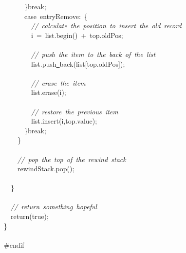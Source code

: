 {\ \ \ \ \ \ \}break;\\
\ \ \ \ \ \ case\ entryRemove:\ \{\\
\ \ \ \ \ \ \ \ \textsl{//\ calculate\ the\ position\ to\ insert\ the\ old\ record}\\
\ \ \ \ \ \ \ \ i\ =\ list.begin()\ +\ top.oldPos;\\
\ \\
\ \ \ \ \ \ \ \ \textsl{//\ push\ the\ item\ to\ the\ back\ of\ the\ list}\\
\ \ \ \ \ \ \ \ list.push\underline\ back(list[top.oldPos]);\\
\ \\
\ \ \ \ \ \ \ \ \textsl{//\ erase\ the\ item}\\
\ \ \ \ \ \ \ \ list.erase(i);\\
\ \\
\ \ \ \ \ \ \ \ \textsl{//\ restore\ the\ previous\ item}\\
\ \ \ \ \ \ \ \ list.insert(i,top.value);\\
\ \ \ \ \ \ \}break;\\
\ \ \ \ \}\\
\ \\
\ \ \ \ \textsl{//\ pop\ the\ top\ of\ the\ rewind\ stack}\\
\ \ \ \ rewindStack.pop();\\
\ \\
\ \ \}\\
\ \\
\ \ \textsl{//\ return\ something\ hopeful}\\
\ \ return(true);\\
\}\\
\ \\
\#endif\\
\ \\
 }
\normalfont\normalsize

